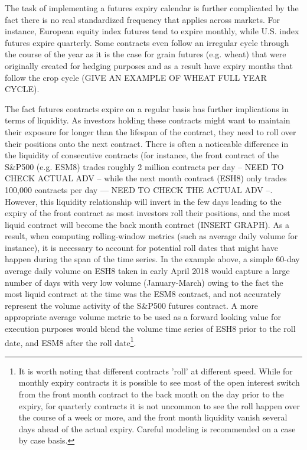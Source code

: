 \begin{itemize}
The task of implementing a futures expiry calendar is further complicated by the fact there is no real standardized frequency that applies across markets. For instance, European equity index futures tend to expire monthly, while U.S. index futures expire quarterly. Some contracts even follow an irregular cycle through the course of the year as it is the case for grain futures (e.g. wheat) that were originally created for hedging purposes and as a result have expiry months that follow the crop cycle (GIVE AN EXAMPLE OF WHEAT FULL YEAR CYCLE).

The fact futures contracts expire on a regular basis has further implications in terms of liquidity. As investors holding these contracts might want to maintain their exposure for longer than the lifespan of the contract, they need to roll over their positions onto the next contract. There is often a noticeable difference in the liquidity of consecutive contracts (for instance, the front contract of the S\&P500 (e.g. ESM8) trades roughly 2 million contracts per day -- NEED TO CHECK ACTUAL ADV -- while the next month contract (ESH8) only trades 100,000 contracts per day --- NEED TO CHECK THE ACTUAL ADV --. However, this liquidity relationship will invert in the few days leading to the expiry of the front contract as most investors roll their positions, and the most liquid contract will become the back month contract (INSERT GRAPH). As a result, when computing rolling-window metrics (such as average daily volume for instance), it is necessary to account for potential roll dates that might have happen during the span of the time series. In the example above, a simple 60-day average daily volume on ESH8 taken in early April 2018 would capture a large number of days with very low volume (January-March) owing to the fact the most liquid contract at the time was the ESM8 contract, and not accurately represent the volume activity of the S\&P500 futures contract. A more appropriate average volume metric to be used as a forward looking value for execution purposes would blend the volume time series of ESH8 prior to the roll date, and ESM8 after the roll date\footnote{It is worth noting that different contracts 'roll' at different speed. While for monthly expiry contracts it is possible to see most of the open interest switch from the front month contract to the back month on the day prior to the expiry, for quarterly contracts it is not uncommon to see the roll happen over the course of a week or more, and the front month liquidity vanish several days ahead of the actual expiry. Careful modeling is recommended on a case by case basis.}. 


\end{itemize}
